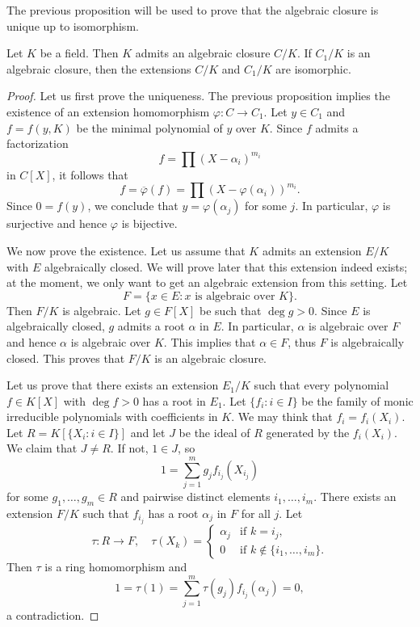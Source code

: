 \lecture
The previous proposition will be used to prove 
that the algebraic closure is unique up to isomorphism. 

\begin{theorem}[Artin]\label{thm:Artin}
	Let $K$ be a field. Then $K$ admits an algebraic closure $C/K$. If $C_1/K$
	is an algebraic closure, then the extensions $C/K$ and $C_1/K$ are
	isomorphic. 
\end{theorem}

\begin{proof}
    Let us first prove the uniqueness. The previous proposition implies the existence of 
    an extension homomorphism $\varphi\colon C\to C_1$. Let $y\in C_1$ and $f=f(y,K)$ be 
    the minimal polynomial of $y$ over $K$. Since $f$ admits a factorization
    \[
        f=\prod (X-\alpha_i)^{m_i}
    \]
    in $C[X]$, it follows that
    \[
    f=\overline{\varphi}(f)=\prod (X-\varphi(\alpha_i))^{m_i}. 
    \]
    Since $0=f(y)$, we conclude that $y=\varphi(\alpha_j)$ for some $j$. In particular, $\varphi$ is
    surjective and hence $\varphi$ is bijective. 
    
    We now prove the existence. Let us assume that $K$ admits an extension $E/K$ 
    with $E$ algebraically closed. We will prove later that this extension indeed exists; at the moment,
    we only want to get an algebraic extension from this setting. Let 
    \[
    	F=\{x\in E:x\text{ is algebraic over }K\}. 
    \]
    Then $F/K$ is algebraic. Let $g\in F[X]$ be such that
    $\deg g>0$. Since $E$ is algebraically closed, $g$ admits a root $\alpha$ in $E$. In particular, $\alpha$
    is algebraic over $F$ and hence $\alpha$ is algebraic over $K$. This implies that $\alpha\in F$, thus
    $F$ is algebraically closed. This proves that $F/K$ is an algebraic closure. 
    
    Let us prove that there exists an extension $E_1/K$ such that
    every polynomial $f\in K[X]$ with $\deg f>0$ has a root in $E_1$. Let 
    $\{f_i:i\in I\}$ be the family of monic irreducible polynomials with coefficients in $K$. 
    We may think that $f_i=f_i(X_i)$. 
    Let $R=K[\{X_i:i\in I\}]$ and let $J$ be the ideal of $R$ 
    generated by the $f_i(X_i)$. We claim that $J\ne R$. If not, $1\in J$, so
    \[
    1=\sum_{j=1}^m g_jf_{i_j}(X_{i_j})
    \]
    for some $g_1,\dots,g_m\in R$ and 
    pairwise distinct elements $i_1,\dots,i_m$. 
    There exists an extension $F/K$ such that
    $f_{i_j}$ has a root $\alpha_j$ in $F$ for all $j$. Let 
    \[
    \tau\colon R\to F,\quad
    \tau(X_k)=\begin{cases}
        \alpha_j & \text{if $k=i_j$},\\
        0 & \text{if $k\not\in\{i_1,\dots,i_m\}$}.
        \end{cases}
    \]
    Then $\tau$ is a ring homomorphism and 
    \[
    1=\tau(1)=\sum_{j=1}^m\tau(g_j)f_{i_j}(\alpha_{j})=0,
    \]
    a contradiction. 
    

\end{proof}
